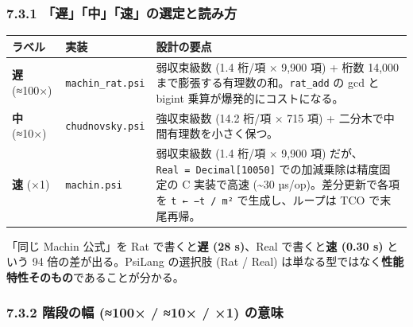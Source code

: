 \documentclass[
]{ltjsarticle}
\newcounter{none} %
\begin{document}
\subsubsection{7.3.1
「遅」「中」「速」の選定と読み方}\label{ux9045ux4e2dux901fux306eux9078ux5b9aux3068ux8aadux307fux65b9}

{\def\LTcaptype{none} %
\begin{longtable}[]{@{}
  >{\raggedright\arraybackslash}p{}
  >{\raggedright\arraybackslash}p{}
  >{\raggedright\arraybackslash}p{}@{}}
\toprule\noalign{}
\begin{minipage}[b]{\linewidth}\raggedright
ラベル
\end{minipage} & \begin{minipage}[b]{\linewidth}\raggedright
実装
\end{minipage} & \begin{minipage}[b]{\linewidth}\raggedright
設計の要点
\end{minipage} \\
\midrule\noalign{}
\endhead
\bottomrule\noalign{}
\endlastfoot
\textbf{遅} (≈100×) & \texttt{machin\_rat.psi} & 弱収束級数 (1.4 桁/項 ×
9,900 項) + 桁数 14,000 まで膨張する有理数の和。\texttt{rat\_add} の gcd
と bigint 乗算が爆発的にコストになる。 \\
\textbf{中} (≈10×) & \texttt{chudnovsky.psi} & 強収束級数 (14.2 桁/項 ×
715 項) + 二分木で中間有理数を小さく保つ。 \\
\textbf{速} (×1) & \texttt{machin.psi} & 弱収束級数 (1.4 桁/項 × 9,900
項) だが、\texttt{Real\ =\ Decimal{[}10050{]}} での加減乗除は精度固定の
C 実装で高速 (\textasciitilde30 µs/op)。差分更新で各項を
\texttt{t\ ←\ −t\ /\ m²} で生成し、ループは TCO で末尾再帰。 \\
\end{longtable}
}

「同じ Machin 公式」を Rat で書くと\textbf{遅 (28 s)}、Real
で書くと\textbf{速 (0.30 s)} という 94 倍の差が出る。PsiLang の選択肢
(Rat / Real)
は単なる型ではなく\textbf{性能特性そのもの}であることが分かる。

\subsubsection{7.3.2 階段の幅 (≈100× / ≈10× / ×1)
の意味}\label{ux968eux6bb5ux306eux5e45-100-10-1-ux306eux610fux5473}
\end{document}
